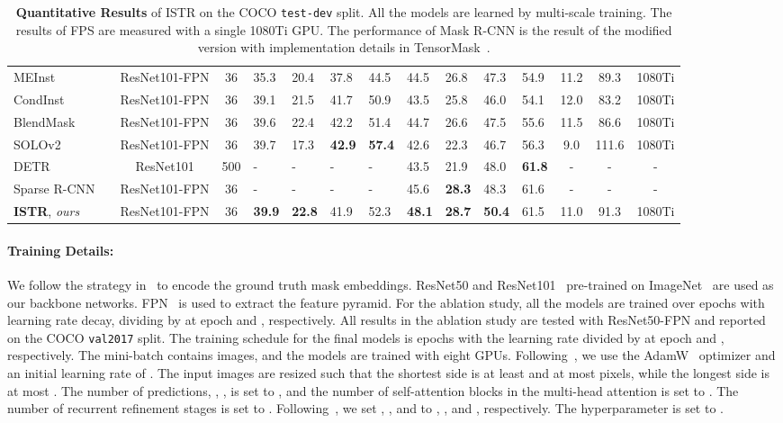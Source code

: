 \documentclass[10pt,twocolumn,letterpaper]{article}
\begin{document}
\begin{table*}[t]
\begin{tabular}{l|c|c|x{22}x{22}x{22}x{22}|x{22}x{22}x{22}x{22}|c|c|c}
MEInst~\cite{zhang2020mask} & ResNet101-FPN & 36 & 35.3 & 20.4 & 37.8 & 44.5 & 44.5 & 26.8 & 47.3 & 54.9 & 11.2 & 89.3 & 1080Ti\\
CondInst~\cite{tian2020conditional} & ResNet101-FPN & 36 & 39.1 & 21.5 & 41.7 & 50.9 & 43.5 & 25.8 & 46.0 & 54.1 & 12.0 & 83.2 & 1080Ti\\
BlendMask~\cite{chen2020blendmask} & ResNet101-FPN & 36 & 39.6 & 22.4 & 42.2 & 51.4 & 44.7 & 26.6 & 47.5 & 55.6 & 11.5 & 86.6 & 1080Ti\\
SOLOv2~~\cite{wang2020solov2} & ResNet101-FPN & 36 & 39.7 & 17.3 & \textbf{42.9} & \textbf{57.4} & 42.6 & 22.3 & 46.7 & 56.3 & 9.0 & 111.6 & 1080Ti\\ \hline
DETR~~\cite{carion2020end} & ResNet101 & 500 & - & - & - & - & 43.5 & 21.9 & 48.0 & \textbf{61.8} & - & - & - \\
Sparse R-CNN~~\cite{sun2020sparse} & ResNet101-FPN & 36 & - & - & - & - & 45.6 & \textbf{28.3} & 48.3 & 61.6 & - & - & - \\\hline
\textbf{ISTR}, \emph{ours} & ResNet101-FPN & 36 & \textbf{39.9} & \textbf{22.8} & 41.9 & 52.3 & \textbf{48.1} & \textbf{28.7} & \textbf{50.4} & 61.5 & 11.0 & 91.3 & 1080Ti
\end{tabular}\vspace{-2.mm}
\caption{\textbf{Quantitative Results} of ISTR on the COCO \texttt{test-dev} split. All the models are learned by multi-scale training. The results of FPS are measured with a single 1080Ti GPU. The performance of Mask R-CNN is the result of the modified version with implementation details in TensorMask~\cite{chen2019tensormask}.}\vspace{-0.5mm}\label{tab2}
\end{table*}
\paragraph{Training Details:} We follow the strategy in~\cite{zhang2020mask,tian2019decoders} to encode the ground truth mask embeddings.
ResNet50 and ResNet101~\cite{he2016deep} pre-trained on ImageNet~\cite{deng2009imagenet} are used as our backbone networks.
FPN~\cite{lin2017feature} is used to extract the feature pyramid.
For the ablation study, all the models are trained over  epochs with learning rate decay, dividing by  at epoch  and , respectively.
All results in the ablation study are tested with ResNet50-FPN and reported on the COCO \texttt{val2017} split.
The training schedule for the final models is  epochs with the learning rate divided by  at epoch  and , respectively.
The mini-batch contains  images, and the models are trained with eight GPUs.
Following~\cite{sun2020sparse}, we use the AdamW~\cite{loshchilov2017decoupled} optimizer and an initial learning rate of .
The input images are resized such that the shortest side is at least  and at most  pixels, while the longest side is at most .
The number of predictions, \ie, , is set to , and the number of self-attention blocks in the multi-head attention is set to .
The number of recurrent refinement stages is set to .
Following~\cite{carion2020end,zhu2020deformable}, we set , , and  to , , and , respectively.
The hyperparameter  is set to .
\end{document}
